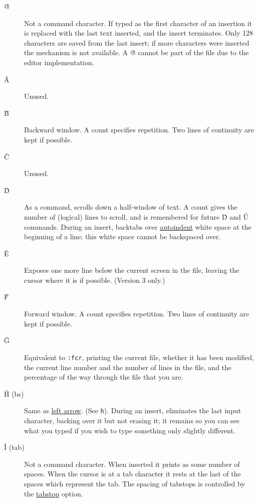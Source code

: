 \begin{description}

\item[\^{@}] Not a command character. If typed as the first character of an
insertion it is replaced with the last text inserted, and the insert
terminates. Only 128 characters are saved from the last insert; if more
characters were inserted the mechanism is not available. A \^{@} cannot be
part of the file due to the editor implementation.

\item[\^{A}] Unused.

\item[\^{B}] Backward window. A count specifies repetition. Two lines of
continuity are kept if possible.

\item[\^{C}] Unused.

\item[\^{D}] As a command, scrolls down a half-window of text. A count gives
the number of (logical) lines to scroll, and is remembered for future \^{D}
and \^{U} commands. During an insert, backtabs over \ul{autoindent} white
space at the beginning of a line; this white space cannot be backspaced over.

\item[\^{E}] Exposes one more line below the current screen in the file,
leaving the cursor where it is if possible. (Version 3 only.)

\item[\^{F}] Forward window. A count specifies repetition. Two lines of
continuity are kept if possible.

\item[\^{G}] Equivalent to {\tt :f\sc cr}, printing the current file, whether
it has been modified, the current line number and the number of lines in the
file, and the percentage of the way through the file that you are.

\item[\^{H} {\sc (bs)}] Same as \ul{left arrow}. (See {\tt h}). During an
insert, eliminates the last input character, backing over it but not erasing
it; it remains so you can see what you typed if you wish to type something
only slightly different.

\item[\^{I} {\sc (tab)}] Not a command character. When inserted it prints as
some number of spaces. When the cursor is at a tab character it rests at the
last of the spaces which represent the tab. The spacing of tabstops is
controlled by the \ul{tabstop} option.


\end{description}
